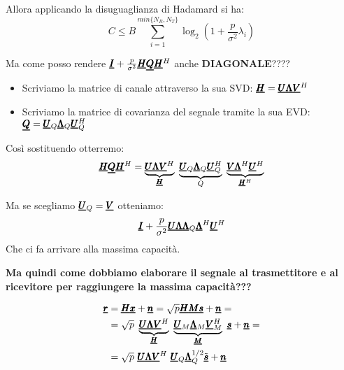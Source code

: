 Allora applicando la disuguaglianza di Hadamard si ha:
\begin{equation*}
    C \leq B \sum_{i=1}^{min\{N_R, N_T\}} \log_2 \left(1 + \frac{p}{\sigma^2} \lambda_i \right)
\end{equation*}

\begin{center}
    Ma come posso rendere $\pmb{\underline{I}} + \frac{p}{\sigma^{2}} \pmb{\underline{H}} \pmb{\underline{Q}} \pmb{\underline{H}}^{H}$ anche \textbf{DIAGONALE}????
\end{center}

\begin{itemize}
    \item Scriviamo la matrice di canale attraverso la sua SVD: $\pmb{\underline{H}} = \pmb{\underline{U}} \pmb{\underline{\Lambda}} \pmb{\underline{V}}^H$
    \item Scriviamo la matrice di covarianza del segnale tramite la sua EVD: $\pmb{\underline{Q}} = \pmb{\underline{U}}_Q \pmb{\underline{\Lambda}}_Q \pmb{\underline{U}}_Q^H$
\end{itemize}

Così sostituendo otterremo:
\begin{equation*}
    \vc{H} \vc{Q} \vc{H}^{H} = \underbrace{\vc{U} \vc{\Lambda} \vc{V}^H}_{\vc{H}} \ \underbrace{\vc{U}_Q \vc{\Lambda}_Q \vc{U}_Q^H}_{Q} \ \underbrace{\vc{V} \vc{\Lambda}^H \vc{U}^H}_{\vc{H}^H}
\end{equation*}

Ma se scegliamo $\pmb{\underline{U}}_Q = \pmb{\underline{V}}$ otteniamo:
\begin{equation*}
    \pmb{\underline{I}} + \frac{p}{\sigma^{2}} \pmb{\underline{U}} \pmb{\underline{\Lambda}} \pmb{\underline{\Lambda}} _Q \pmb{\underline{\Lambda}}^H \pmb{\underline{U}}^H
\end{equation*}
Che ci fa arrivare alla massima capacità.\\

\begin{center}
    \textbf{Ma quindi come dobbiamo elaborare il segnale al trasmettitore e al ricevitore per raggiungere la massima capacità???}  
\end{center}

\begin{equation*}
\begin{aligned}
     \pmb{\underline{r}} &= \pmb{\underline{H}} \pmb{\underline{x}} + \pmb{\underline{n}} = \sqrt{p} \pmb{\underline{H}} \pmb{\underline{M}} \pmb{\underline{s}} + \pmb{\underline{n}} = \\
     &= \sqrt{p} \  \underbrace{\pmb{\underline{U}} \pmb{\underline{\Lambda}} \pmb{\underline{V}}^H}_{\pmb{\underline{H}}} \ \underbrace{\pmb{\underline{U}}_M \pmb{\underline{\Lambda}}_M \pmb{\underline{V}}_M^H}_{\pmb{\underline{M}}} \ \pmb{\underline{s}} + \pmb{\underline{n}} = \\
     &= \sqrt{p} \ \pmb{\underline{U}} \pmb{\underline{\Lambda}} \pmb{\underline{V}}^H \ \pmb{\underline{U}}_Q \pmb{\underline{\Lambda}}_Q^{1/2} \tilde{\pmb{\underline{s}}} + \pmb{\underline{n}}
\end{aligned}
\end{equation*}

